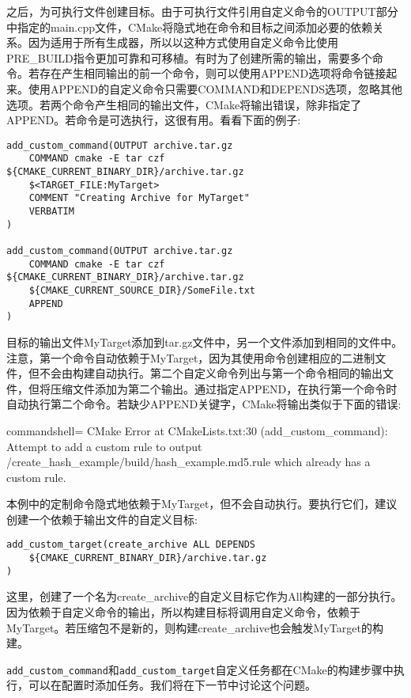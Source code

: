 之后，为可执行文件创建目标。由于可执行文件引用自定义命令的OUTPUT部分中指定的main.cpp文件，CMake将隐式地在命令和目标之间添加必要的依赖关系。因为适用于所有生成器，所以以这种方式使用自定义命令比使用PRE\_BUILD指令更加可靠和可移植。有时为了创建所需的输出，需要多个命令。若存在产生相同输出的前一个命令，则可以使用APPEND选项将命令链接起来。使用APPEND的自定义命令只需要COMMAND和DEPENDS选项，忽略其他选项。若两个命令产生相同的输出文件，CMake将输出错误，除非指定了APPEND。若命令是可选执行，这很有用。看看下面的例子:

\begin{lstlisting}[style=styleCMake]
add_custom_command(OUTPUT archive.tar.gz
	COMMAND cmake -E tar czf ${CMAKE_CURRENT_BINARY_DIR}/archive.tar.gz
	$<TARGET_FILE:MyTarget>
	COMMENT "Creating Archive for MyTarget"
	VERBATIM
)

add_custom_command(OUTPUT archive.tar.gz
	COMMAND cmake -E tar czf ${CMAKE_CURRENT_BINARY_DIR}/archive.tar.gz
	${CMAKE_CURRENT_SOURCE_DIR}/SomeFile.txt
	APPEND
)
\end{lstlisting}

目标的输出文件MyTarget添加到tar.gz文件中，另一个文件添加到相同的文件中。注意，第一个命令自动依赖于MyTarget，因为其使用命令创建相应的二进制文件，但不会由构建自动执行。第二个自定义命令列出与第一个命令相同的输出文件，但将压缩文件添加为第二个输出。通过指定APPEND，在执行第一个命令时自动执行第二个命令。若缺少APPEND关键字，CMake将输出类似于下面的错误:

\begin{tcblisting}{commandshell={}}
CMake Error at CMakeLists.txt:30 (add_custom_command):
  Attempt to add a custom rule to output
    /create_hash_example/build/hash_example.md5.rule
  which already has a custom rule.
\end{tcblisting}

本例中的定制命令隐式地依赖于MyTarget，但不会自动执行。要执行它们，建议创建一个依赖于输出文件的自定义目标:

\begin{lstlisting}[style=styleCMake]
add_custom_target(create_archive ALL DEPENDS
	${CMAKE_CURRENT_BINARY_DIR}/archive.tar.gz
)
\end{lstlisting}

这里，创建了一个名为create\_archive的自定义目标它作为All构建的一部分执行。因为依赖于自定义命令的输出，所以构建目标将调用自定义命令，依赖于MyTarget。若压缩包不是新的，则构建create\_archive也会触发MyTarget的构建。

\texttt{add\_custom\_command}和\texttt{add\_custom\_target}自定义任务都在CMake的构建步骤中执行，可以在配置时添加任务。我们将在下一节中讨论这个问题。

